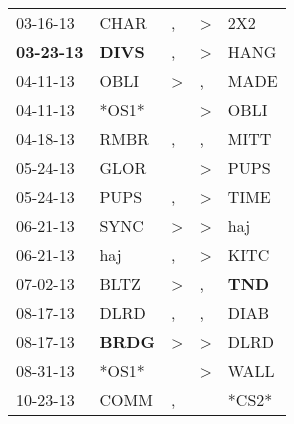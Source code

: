 \begin{supertabular}{p{0.07\textwidth}p{0.06\textwidth}p{0.02\textwidth}p{0.02\textwidth}p{0.06\textwidth}}
          03-16-13\textsuperscript{} &           CHAR\textsuperscript{} &                , &     \textgreater &            2X2\textsuperscript{} \\
 \textbf{03-23-13\textsuperscript{}} &  \textbf{DIVS\textsuperscript{}} &                , &     \textgreater &           HANG\textsuperscript{} \\
          04-11-13\textsuperscript{} &           OBLI\textsuperscript{} &     \textgreater &                , &           MADE\textsuperscript{} \\
          04-11-13\textsuperscript{} &                            *OS1* &                  &     \textgreater &           OBLI\textsuperscript{} \\
          04-18-13\textsuperscript{} &           RMBR\textsuperscript{} &                , &                , &           MITT\textsuperscript{} \\
          05-24-13\textsuperscript{} &           GLOR\textsuperscript{} &                  &     \textgreater &           PUPS\textsuperscript{} \\
          05-24-13\textsuperscript{} &           PUPS\textsuperscript{} &                , &     \textgreater &           TIME\textsuperscript{} \\
          06-21-13\textsuperscript{} &           SYNC\textsuperscript{} &     \textgreater &     \textgreater &            haj\textsuperscript{} \\
          06-21-13\textsuperscript{} &            haj\textsuperscript{} &                , &     \textgreater &           KITC\textsuperscript{} \\
          07-02-13\textsuperscript{} &           BLTZ\textsuperscript{} &     \textgreater &                , &   \textbf{TND\textsuperscript{}} \\
          08-17-13\textsuperscript{} &           DLRD\textsuperscript{} &                , &                , &           DIAB\textsuperscript{} \\
          08-17-13\textsuperscript{} &  \textbf{BRDG\textsuperscript{}} &     \textgreater &     \textgreater &           DLRD\textsuperscript{} \\
          08-31-13\textsuperscript{} &                            *OS1* &                  &     \textgreater &           WALL\textsuperscript{} \\
          10-23-13\textsuperscript{} &           COMM\textsuperscript{} &                , &                  &                            *CS2* \\

\end{supertabular}
